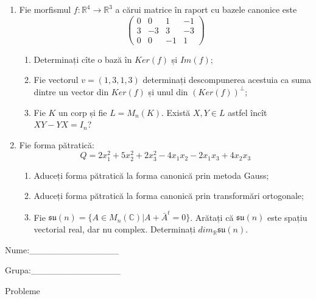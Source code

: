 \documentclass{article}
\begin{document}
\begin{enumerate}
 \item Fie morfismul $f:\mathbb{R}^4 \to \mathbb{R}^3$ a cărui matrice în raport cu bazele canonice este
$$\begin{pmatrix}
0&0&1&-1\\
3&-3&3&-3\\
0&0&-1&1
\end{pmatrix}$$

\begin{enumerate}
\item Determinați cîte o bază în $Ker(f)$ și $Im(f)$;
\item Fie vectorul $v=(1,3,1,3)$ determinați descompunerea acestuia ca suma dintre un vector din $Ker(f)$ și unul din $(Ker(f))^\perp$;
\item Fie $K$ un corp și fie $L=M_n(K)$. Există $X,Y \in L$ astfel încît $XY-YX=I_n$?  
\end{enumerate}
\item Fie forma pătratică:
$$Q= 2x_1^2+5x_2^2+2x_3^2-4x_1x_2-2x_1x_3+4x_2x_3$$

\begin{enumerate}
\item Aduceți forma pătratică la forma canonică prin metoda Gauss;
\item Aduceți forma pătratică la forma canonică prin transformări ortogonale;
\item Fie $\mathfrak{su}(n)=\{ A \in M_n(\mathbb{C}) | A+\bar{A}^t=0\}$. Arătați că $\mathfrak{su}(n)$ este spațiu vectorial real, dar nu complex.
Determinați $dim_{\mathbb{R}}\mathfrak{su}(n)$.
\end{enumerate}
\end{enumerate}
\newpage
\begin{flushright}
Nume:\_\_\_\_\_\_\_\_\_\_\_\_\_\_
 
 
Grupa:\_\_\_\_\_\_\_\_\_\_\_\_\_\_
\end{flushright}
\begin{center}
\vspace{2cm}
{\Large Probleme}
\vspace{2cm}
\end{center}
\end{document}
